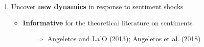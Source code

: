 \documentclass[hyperref={pdfpagelabels=false}]{beamer}
\begin{document}
{\begin{enumerate}
\bigskip

	\item Uncover \textbf{new dynamics} in response to sentiment shocks 
	\begin{itemize}
		\item \footnotesize{\textbf{Informative} for the theoretical literature on sentiments} 
		\begin{itemize}
		\item[$\Rightarrow$] Angeletos and La'O (2013); Angeletos et al. (2018)
		\end{itemize}
		
		
		

	


\end{itemize}
\end{enumerate}}
\end{document}

